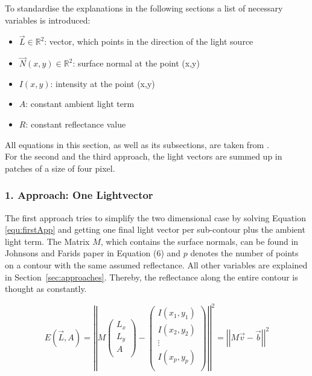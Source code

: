 To standardise the explanations in the following sections a list of necessary variables is introduced: 
\begin{itemize}
\item $\vec{L} \in \mathbb{R}^2$: vector, which points in the direction of the light source 
\item $\vec{N}(x,y)\in \mathbb{R}^2$: surface normal at the point (x,y) 
\item $I(x,y)$: intensity at the point (x,y)
\item $A$: constant ambient light term
\item $R$: constant reflectance value
\end{itemize}
All equations in this section, as well as its subsections, are taken from \cite{Johnson}. \\
For the second and the third approach, the light vectors are summed up in patches of a size of four pixel. 

\subsubsection{1. Approach: One Lightvector}\label{sec:appOne}

The first approach tries to simplify the two dimensional case by solving Equation \ref{equ:firstApp} and getting one final light vector per sub-contour plus the ambient light term. The Matrix $M$, which contains the surface normals, can be found in Johnsons and Farids paper \cite{Johnson} in Equation (6) and $p$ denotes the number of points on a contour with the same assumed reflectance. All other variables are explained in Section~\ref{sec:approaches}. Thereby, the reflectance along the entire contour is thought as constantly. 

\begin{equation}
\label{equ:firstApp}
E(\vec{L} , A) = 
\left\vert \left\vert 
M
\begin{pmatrix}
L_{x} \\
L_{y} \\
A \\
\end{pmatrix} -
\begin{pmatrix}
I(x_{1} , y_{1}) \\
I(x_{2} , y_{2}) \\
\vdots \\
I(x_{p} , y_{p}) \\
\end{pmatrix}
 \right\vert\right\vert^{2}
 = \left\vert \left\vert  M\vec{v}-\vec{b}  \right\vert\right\vert^{2}
\end{equation}

